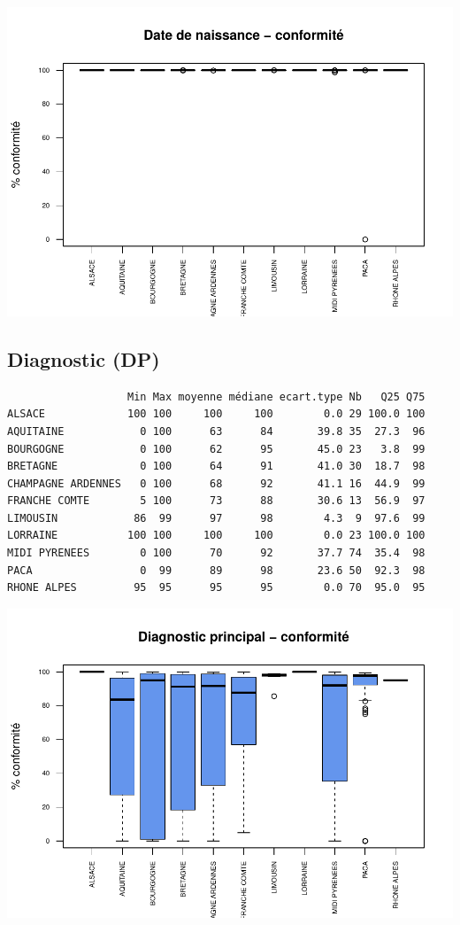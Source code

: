 \documentclass[]{article}
\begin{document}
\includegraphics{septembre2015_files/figure-latex/unnamed-chunk-32-1.pdf}

\subsection{Diagnostic (DP)}\label{diagnostic-dp-1}

\begin{verbatim}
                   Min Max moyenne médiane ecart.type Nb   Q25 Q75
ALSACE             100 100     100     100        0.0 29 100.0 100
AQUITAINE            0 100      63      84       39.8 35  27.3  96
BOURGOGNE            0 100      62      95       45.0 23   3.8  99
BRETAGNE             0 100      64      91       41.0 30  18.7  98
CHAMPAGNE ARDENNES   0 100      68      92       41.1 16  44.9  99
FRANCHE COMTE        5 100      73      88       30.6 13  56.9  97
LIMOUSIN            86  99      97      98        4.3  9  97.6  99
LORRAINE           100 100     100     100        0.0 23 100.0 100
MIDI PYRENEES        0 100      70      92       37.7 74  35.4  98
PACA                 0  99      89      98       23.6 50  92.3  98
RHONE ALPES         95  95      95      95        0.0 70  95.0  95
\end{verbatim}

\includegraphics{septembre2015_files/figure-latex/unnamed-chunk-33-1.pdf}
\end{document}
